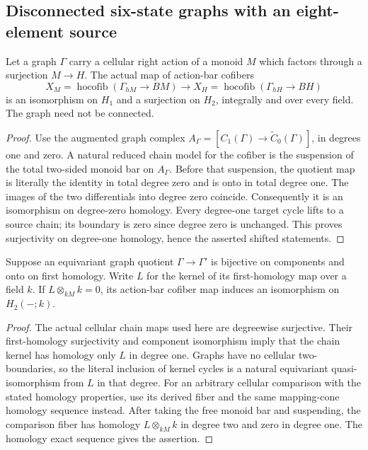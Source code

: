 \subsection{Disconnected six-state graphs with an eight-element source}

\begin{lemma}
\label{C:graph-action-image-low-homology}
Let a graph $\Gamma$ carry a cellular right action of a monoid $M$
which factors through a surjection $M\to H$.  The actual map of
action-bar cofibers
\[
 X_M=\operatorname{hocofib}(\Gamma_{hM}\to BM)
       \longrightarrow
 X_H=\operatorname{hocofib}(\Gamma_{hH}\to BH)
\]
is an isomorphism on $H_1$ and a surjection on $H_2$, integrally
and over every field.  The graph need not be connected.
\end{lemma}
\begin{proof}
Use the augmented graph complex
$A_\Gamma=[C_1(\Gamma)\to\widetilde C_0(\Gamma)]$,
in degrees one and zero.  A natural reduced chain model for the
cofiber is the suspension of the total two-sided monoid bar on
$A_\Gamma$.  Before that suspension, the quotient map is literally
the identity in total degree zero and is onto in total degree one.
The images of the two differentials into degree zero coincide.
Consequently it is an isomorphism on degree-zero homology.
Every degree-one target cycle lifts to a source chain; its boundary
is zero since degree zero is unchanged.  This proves surjectivity
on degree-one homology, hence the asserted shifted statements.
\end{proof}

\begin{lemma}
\label{C:graph-cycle-kernel-quotient}
Suppose an equivariant graph quotient $\Gamma\to\Gamma'$ is
bijective on components and onto on first homology.  Write $L$
for the kernel of its first-homology map over a field $k$.
If $L\otimes_{kM}k=0$, its action-bar cofiber map induces an
isomorphism on $H_2(-;k)$.
\end{lemma}
\begin{proof}
The actual cellular chain maps used here are degreewise
surjective.  Their first-homology surjectivity and component
isomorphism imply that the chain kernel has homology only $L$
in degree one.  Graphs have no cellular two-boundaries, so the
literal inclusion of kernel cycles is a natural equivariant
quasi-isomorphism from $L$ in that degree.  For an arbitrary
cellular comparison with the stated homology properties, use its
derived fiber and the same mapping-cone homology sequence instead.
After taking the free monoid bar and suspending, the comparison
fiber has homology $L\otimes_{kM}k$ in degree two and zero in
degree one.  The homology exact sequence gives the assertion.
\end{proof}

